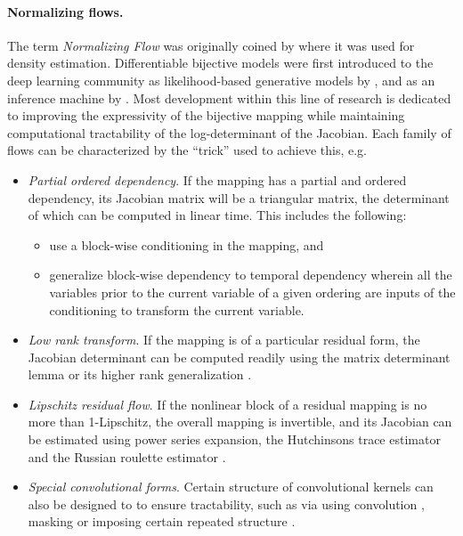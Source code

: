 \documentclass{article}
\begin{document}
\paragraph{Normalizing flows.}
The term \emph{Normalizing Flow} was originally coined by \citet{tabak2010density,tabak2013family} where it was used for density estimation.
Differentiable bijective models were first introduced to the deep learning community as likelihood-based generative models by \citet{rippel2013high,dinh2014nice}, and as an inference machine by \citet{rezende2015variational}. 
Most development within this line of research is dedicated to improving the expressivity of the bijective mapping while maintaining computational tractability of the log-determinant of the Jacobian. 
Each family of flows can be characterized by the ``trick'' used to achieve this, e.g.
\begin{itemize}
\item \emph{Partial ordered dependency}. 
If the mapping has a partial and ordered dependency, its Jacobian matrix will be a triangular matrix, the determinant of which can be computed in linear time. This includes the following:
\begin{itemize}
    \item \citet{dinh2014nice,dinh2016density,kingma2018glow,ho2019flow++} use a block-wise conditioning in the mapping, and
    \item \citet{kingma2016improved,chen2016variational, papamakarios2017masked,huang2018neural} generalize block-wise dependency to temporal dependency wherein all the variables prior to the current variable of a given ordering are inputs of the conditioning to transform the current variable.
\end{itemize}
\item \emph{Low rank transform}.
If the mapping is of a particular residual form, the Jacobian determinant can be computed readily using the matrix determinant lemma \citep{rezende2015variational}
or its higher rank generalization \citep{berg2018sylvester}.
\item \emph{Lipschitz residual flow}. If the nonlinear block of a residual mapping is no more than 1-Lipschitz, the overall mapping is invertible, and its Jacobian can be estimated using power series expansion, the Hutchinsons trace estimator \citep{behrmann2018invertible} and the Russian roulette estimator \citep{chen2019residualflows}. 
\item \emph{Special convolutional forms}. Certain structure of convolutional kernels can also be designed to to ensure tractability, such as via using  convolution \citep{kingma2018glow}, masking \citep{oord2016pixel,NIPS2016_6527,hoogeboom2019emerging,song2019mintnet,ma2019macow} or imposing certain repeated structure \citep{karami2019invertible}.
\end{itemize}
\end{document}
